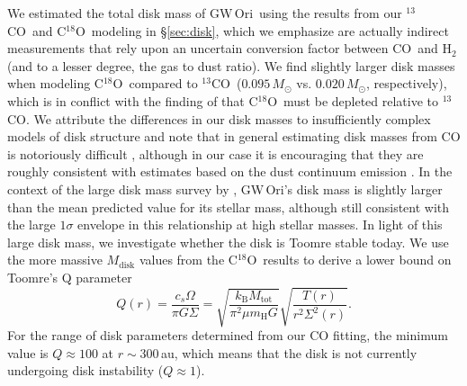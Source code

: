 \documentclass[twocolumn]{aastex61}
\newcommand{\obj}{GW\,Ori}
\newcommand{\twelve}{CO}
\newcommand{\thirteen}{${}^{13}$CO}
\newcommand{\eighteen}{C${}^{18}$O}
\begin{document}
We estimated the total disk mass of \obj\ using the results from our \thirteen\ and \eighteen\ modeling in \S\ref{sec:disk}, which we emphasize are actually indirect measurements that rely upon an uncertain conversion factor between \twelve\ and $\mathrm{H}_2$ (and to a lesser degree, the gas to dust ratio). We find slightly larger disk masses when modeling \eighteen\ compared to \thirteen\ ($0.095\,M_\odot$ vs. $0.020\,M_\odot$, respectively), which is in conflict with the finding of \citet{fang17} that \eighteen\ must be depleted relative to \thirteen. We attribute the differences in our disk masses to insufficiently complex models of disk structure and note that in general estimating disk masses from CO is notoriously difficult \citep{yu17}, although in our case it is encouraging that they are roughly consistent with estimates based on the dust continuum emission \citep[$0.1\,M_\sun$;][]{fang17}.
In the context of the large disk mass survey by \citet{andrews13}, \obj's disk mass is slightly larger than the mean predicted value for its stellar mass, although still consistent with the large $1\sigma$ envelope in this relationship at high stellar masses.
In light of this large disk mass, we investigate whether the disk is Toomre stable today. We use the more massive $M_\mathrm{disk}$ values from the \eighteen\ results to derive a lower bound on Toomre's Q parameter
\begin{equation}
Q(r) = \frac{c_s \Omega}{\pi G \Sigma} = \sqrt{\frac{k_\mathrm{B} M_\mathrm{tot}}{\pi^2 \mu m_\mathrm{H} G}} \sqrt{\frac{T(r)}{r^2 \Sigma^2(r)}}.
\end{equation}
For the range of disk parameters determined from our CO fitting, the minimum value is $Q \approx 100$ at $r \sim 300\,$au, which means that the disk is not currently undergoing disk instability ($Q \approx 1$).
\end{document}

